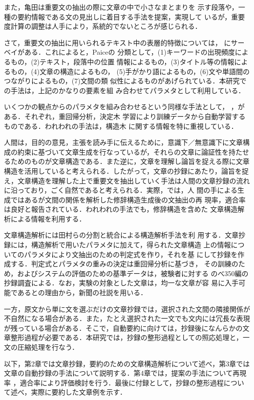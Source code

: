 また，亀田\cite{Kameda:97}は重要文の抽出の際に文章の中で小さなまとまりを
示す段落や，一種の要約情報である文の見出しに着目する手法を提案，実現して
いるが，重要度計算の調整は人手により，系統的でないところが感じられる．

さて，重要文の抽出に用いられるテキスト中の表層的特徴については，
\cite{Okumura:98}にサーベイがある．これによると，Paice\cite{Paice:90}の
分類として，(1)キーワードの出現頻度によるもの，(2)テキスト，段落中の位置
情報によるもの，(3)タイトル等の情報によるもの，(4)文章の構造によるもの，
(5)手がかり語によるもの，(6)文や単語間のつながりによるもの，(7)文間の類
似性によるものがあげられている．本研究での手法は，上記のかなりの要素を組
み合わせてパラメタとして利用している．

いくつかの観点からのパラメタを組み合わせるという同様な手法として，
\cite{Watanabe:96}，\cite{Nomoto:97}がある．それぞれ，重回帰分析，決定木
学習により訓練データから自動学習するものである．われわれの手法は，構造木
に関する情報を特に重視している．

人間は，目的の意見，主張を読み手に伝えるために，意識下／無意識下に文章構
成の約束に基づいて文章生成を行なっているが，それらの文章に論証性を持たせ
るためのものが文章構造である．また逆に，文章を理解し論旨を捉える際に文章
構造を活用していると考えられる．したがって，文章の抄録にあたり，論旨を捉
え，文章構造を理解した上で重要文を抽出していく手法は人間の文章抄録の流れ
に沿っており，ごく自然であると考えられる．実際，\cite{Marcu:97}では，人
間の手による生成ではあるが文間の関係を解析した修辞構造生成後の文抽出の再
現率，適合率は良好と報告されている．われわれの手法でも，修辞構造を含めた
文章構造解析による情報を利用する．

文章構造解析には田村ら\cite{Tamura:98}の分割と統合による構造解析手法を利
用する．文章抄録には，構造解析で用いたパラメタに加えて，得られた文章構造
上の情報についてのパラメタにより文抽出のための判定式を作り，それを基 
にして抄録を作成する．判定式とパラメタの重みの決定は重回帰分析に基づき， 
その訓練のため，およびシステムの評価のための基準データは，被験者に対する 
のべ350編の抄録調査による．なお，実験の対象とした文章は，均一な文章が容
易に入手可能であるとの理由から，新聞の社説を用いる．

一方，原文から単に文を選ぶだけの文章抄録では，選択された文間の隣接関係が
不自然になる場合がある．また，たとえ選択された一文でも文内には冗長な表現
が残っている場合がある．そこで，自動要約に向けては，抄録後になんらかの文
章整形過程が必要である．本研究では，抄録の整形過程としての照応処理と，一
文の圧縮処理を行なう．

以下，第2章では文章抄録，要約のための文章構造解析について述べ，第3章では 
文章の自動抄録の手法について説明する．第4章では，提案の手法について再現
率 ，適合率により評価検討を行う．最後に付録として，抄録の整形過程につい
て述べ，実際に要約した文章例を示す．

